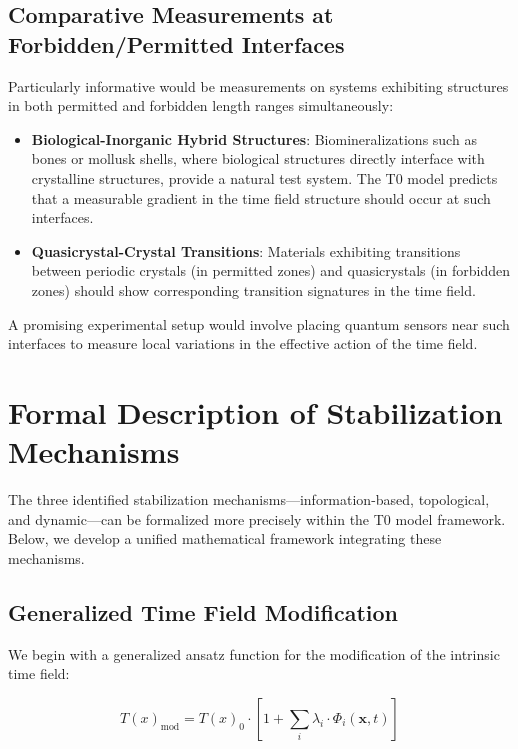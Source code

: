 \documentclass[12pt,a4paper]{article}
\newcommand{\Tfield}{T(x)}
\begin{document}
	\subsection{Comparative Measurements at Forbidden/Permitted Interfaces}
	
	Particularly informative would be measurements on systems exhibiting structures in both permitted and forbidden length ranges simultaneously:
	
	\begin{itemize}
		\item \textbf{Biological-Inorganic Hybrid Structures}: Biomineralizations such as bones or mollusk shells, where biological structures directly interface with crystalline structures, provide a natural test system. The T0 model predicts that a measurable gradient in the time field structure should occur at such interfaces.
		
		\item \textbf{Quasicrystal-Crystal Transitions}: Materials exhibiting transitions between periodic crystals (in permitted zones) and quasicrystals (in forbidden zones) should show corresponding transition signatures in the time field.
	\end{itemize}
	
	A promising experimental setup would involve placing quantum sensors near such interfaces to measure local variations in the effective action of the time field.
	
	\section{Formal Description of Stabilization Mechanisms}
	
	The three identified stabilization mechanisms—information-based, topological, and dynamic—can be formalized more precisely within the T0 model framework. Below, we develop a unified mathematical framework integrating these mechanisms.
	
	\subsection{Generalized Time Field Modification}
	
	We begin with a generalized ansatz function for the modification of the intrinsic time field:
	
	\begin{equation}
		\Tfield_{\text{mod}} = \Tfield_0 \cdot \left[ 1 + \sum_i \lambda_i \cdot \Phi_i(\mathbf{x}, t) \right]
	\end{equation}
	
\end{document}
